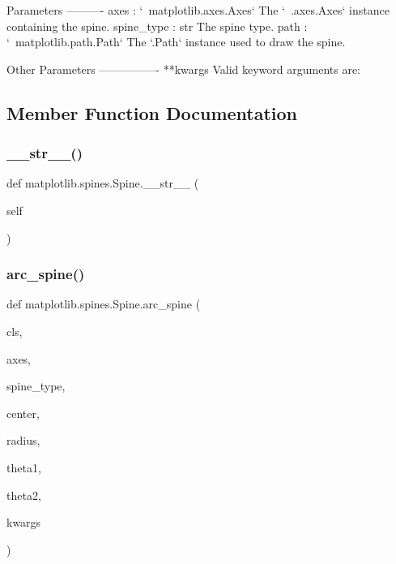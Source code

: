 \begin{DoxyVerb}Parameters
----------
axes : `~matplotlib.axes.Axes`
    The `~.axes.Axes` instance containing the spine.
spine_type : str
    The spine type.
path : `~matplotlib.path.Path`
    The `.Path` instance used to draw the spine.

Other Parameters
----------------
**kwargs
    Valid keyword arguments are:

\end{DoxyVerb}
 

\subsection{Member Function Documentation}
\mbox{\label{classmatplotlib_1_1spines_1_1Spine_aa2d07d1d4a22717d2b73d8d8ca7dd0f8}} 
\subsubsection{\texorpdfstring{\+\_\+\+\_\+str\+\_\+\+\_\+()}{\_\_str\_\_()}}
{\footnotesize\ttfamily def matplotlib.\+spines.\+Spine.\+\_\+\+\_\+str\+\_\+\+\_\+ (\begin{DoxyParamCaption}\item[{}]{self }\end{DoxyParamCaption})}

\mbox{\label{classmatplotlib_1_1spines_1_1Spine_a1e032bbe9a84985351d9faa8fbed4d82}} 
\subsubsection{\texorpdfstring{arc\+\_\+spine()}{arc\_spine()}}
{\footnotesize\ttfamily def matplotlib.\+spines.\+Spine.\+arc\+\_\+spine (\begin{DoxyParamCaption}\item[{}]{cls,  }\item[{}]{axes,  }\item[{}]{spine\+\_\+type,  }\item[{}]{center,  }\item[{}]{radius,  }\item[{}]{theta1,  }\item[{}]{theta2,  }\item[{}]{kwargs }\end{DoxyParamCaption})}

